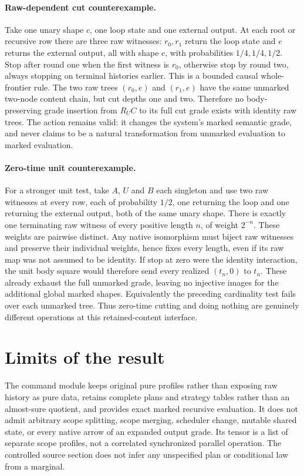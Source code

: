 \documentclass{article}
\begin{document}
\paragraph{Raw-dependent cut counterexample.}
Take one unary shape $c$, one loop state and one external output. At each root
or recursive row there are three raw witnesses: $r_0,r_1$ return the loop state
and $e$ returns the external output, all with shape $c$, with probabilities
$1/4,1/4,1/2$. Stop after round one when the first witness is $r_0$, otherwise
stop by round two, always stopping on terminal histories earlier. This is a
bounded causal whole-frontier rule. The two raw trees $(r_0,e)$ and $(r_1,e)$
have the same unmarked two-node content chain, but cut depths one and two.
Therefore no body-preserving grade insertion from $R_UC$ to its full cut grade
exists with identity raw trees. The action remains valid: it changes the
system's marked semantic grade, and never claims to be a natural
transformation from unmarked evaluation to marked evaluation.

\paragraph{Zero-time unit counterexample.}
For a stronger unit test, take $A$, $U$ and $B$ each singleton and use
two raw witnesses at every row, each of
probability $1/2$, one returning the loop and one returning the external
output, both of the same unary shape. There is exactly one terminating raw
witness of every positive length $n$, of weight $2^{-n}$. These weights are
pairwise distinct. Any native isomorphism must biject raw witnesses and
preserve their individual weights, hence fixes every length, even if its raw
map was not assumed to be identity. If stop at zero were the identity
interaction, the unit body square would therefore send every realized
$(t_n,0)$ to $t_n$. These already exhaust the full unmarked grade, leaving no
injective images for the additional global marked shapes.
Equivalently the preceding cardinality test fails over each unmarked tree.
Thus zero-time cutting and doing nothing are genuinely different operations
at this retained-content interface.

\section{Limits of the result}
The command module keeps original pure profiles rather than exposing raw
history as pure data, retains complete plans and strategy tables rather than
an almost-sure quotient, and provides exact marked recursive evaluation.
It does not admit arbitrary scope splitting, scope merging, scheduler change,
mutable shared state, or every native arrow of an expanded output grade.
Its tensor is a list of separate scope profiles, not a correlated synchronized
parallel operation. The controlled source section does not infer any
unspecified plan or conditional law from a marginal.
\end{document}
